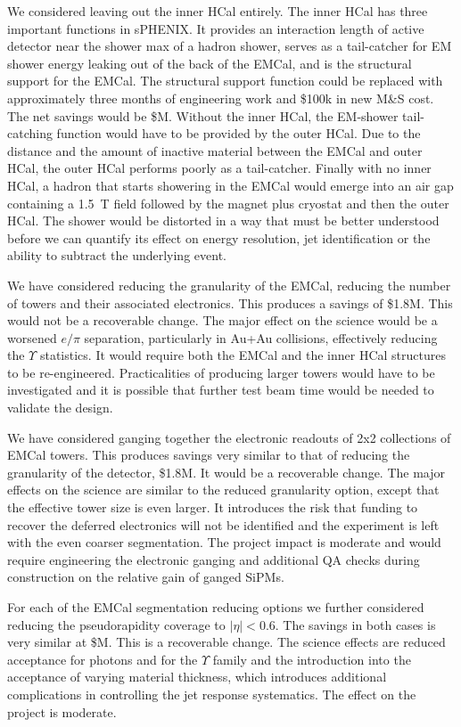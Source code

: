 We considered leaving out the inner HCal entirely.  The inner HCal has
three important functions in sPHENIX.  It provides an interaction
length of active detector near the shower max of a hadron shower,
serves as a tail-catcher for EM shower energy leaking out of the back
of the EMCal, and is the structural support for the EMCal.  The
structural support function could be replaced with approximately three
months of engineering work and \$100k in new M\&S cost.  The net
savings would be \${\noInnerHCal}M.  Without the inner HCal, the
EM-shower tail-catching function would have to be provided by the
outer HCal.  Due to the distance and the amount of inactive material
between the EMCal and outer HCal, the outer HCal performs poorly as a
tail-catcher.  Finally with no inner HCal, a hadron that starts
showering in the EMCal would emerge into an air gap containing a 1.5~T
field followed by the magnet plus cryostat and then the outer HCal.
The shower would be distorted in a way that must be better understood
before we can quantify its effect on energy resolution, jet
identification or the ability to subtract the underlying event.

We have considered reducing the granularity of the EMCal, reducing the
number of towers and their associated electronics.  This produces a
savings of \$1.8M.  This would not be a recoverable change.  The major
effect on the science would be a worsened $e/\pi$ separation,
particularly in Au+Au collisions, effectively reducing the $\Upsilon$
statistics.  It would require both the EMCal and the inner HCal
structures to be re-engineered.  Practicalities of producing larger
towers would have to be investigated and it is possible that further test
beam time would be needed to validate the design.

We have considered ganging together the electronic readouts of 2x2
collections of EMCal towers. This produces savings very similar to
that of reducing the granularity of the detector, \$1.8M.  It would be
a recoverable change.  The major effects on the science are similar to
the reduced granularity option, except that the effective tower size
is even larger.  It introduces the risk that funding to recover the
deferred electronics will not be identified and the experiment is left
with the even coarser segmentation.  The project impact is moderate
and would require engineering the electronic ganging and additional QA
checks during construction on the relative gain of ganged SiPMs.

For each of the EMCal segmentation reducing options we further
considered reducing the pseudorapidity coverage to $|\eta| < 0.6$.
The savings in both cases is very similar at \${\reducedEMCaleta}M.
This is a recoverable change.  The science effects are reduced
acceptance for photons and for the $\Upsilon$ family and the
introduction into the acceptance of varying material thickness, which
introduces additional complications in controlling the jet response
systematics. The effect on the project is moderate.


